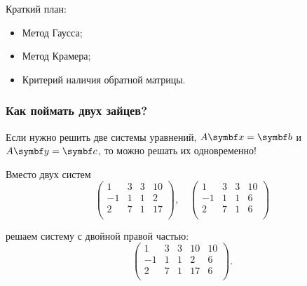 
\begin{frame} %


\end{frame}



\begin{frame}{Краткий план:}
  \begin{itemize}[<+->]
    \item Метод Гаусса;
    \item Метод Крамера;
    \item Критерий наличия обратной матрицы.
  \end{itemize}

\end{frame}




\begin{frame}
    \frametitle{Как поймать двух зайцев?}

    Если нужно решить две системы уравнений, $A \bx = \bb$ и $A \by = \bc$, то можно решать их одновременно!

    \pause

    Вместо двух систем
    \[
            \left(
            \begin{array}{ccc|c}
            1 & 3 & 3  & 10 \\
            -1 & 1 & 1 & 2 \\
            2 & 7 & 1  & 17 \\
            \end{array}
            \right), \quad
            \left(
            \begin{array}{ccc|c}
            1 & 3 & 3  & 10 \\
            -1 & 1 & 1 & 6 \\
            2 & 7 & 1  & 6 \\
            \end{array}
            \right)    
    \]
    \pause

    решаем систему \alert{с двойной правой частью}:
\[
        \left(
        \begin{array}{ccc|cc}
        1 & 3 & 3  & 10 & 10 \\
        -1 & 1 & 1 & 2 & 6 \\
        2 & 7 & 1  & 17 & 6 \\
        \end{array}
        \right).
\]


\end{frame}




